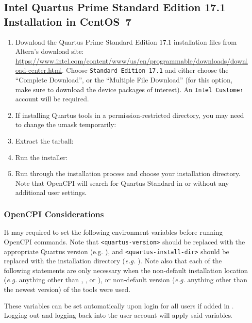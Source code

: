 \subsection{Intel Quartus Prime Standard Edition 17.1 Installation in CentOS~7}
\begin{flushleft}
\begin{enumerate}
	\item Download the Quartus Prime Standard Edition 17.1 installation files from Altera's download site: \url{https://www.intel.com/content/www/us/en/programmable/downloads/download-center.html}. Choose \verb+Standard Edition 17.1+ and either choose the ``Complete Download'', or the ``Multiple File Download'' (for this option, make sure to download the device packages of interest). An \verb+Intel Customer+ account will be required.
\item If installing Quartus tools in a permission-restricted directory, you may need to change the umask temporarily:\newline
{}\newline
{}
\item Extract the tarball:\newline
{}
\item Run the installer:\newline
{}\newline
\item Run through the installation process and choose your installation directory. Note that OpenCPI will search for Quartus Standard in  or  without any additional user settings.
\end{enumerate}

\subsubsection{OpenCPI Considerations}
It may required to set the following environment variables before running OpenCPI commands. Note that \texttt{<quartus-version>} should be replaced with the appropriate Quartus version (e.g. ), and \texttt{<quartus-install-dir>} should be replaced with the installation directory (\textit{e.g.} ). Note also that each of the following  statements are only necessary when the non-default installation location (\textit{e.g.} anything other than , ,  or ), or non-default version (\textit{e.g.} anything other than the newest version) of the tools were used.\newline
{}\newline
{}\newline
{}

These variables can be set automatically upon login for all users if added in . Logging out and logging back into the user account will apply said variables.

\end{flushleft}

